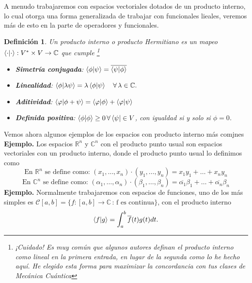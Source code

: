 \documentclass[letterpaper]{book}
\newtheorem{def.}{Definici\'on}[section]
\newcommand{\eje}{{\noindent \sc \textbf{Ejemplo. }}}
\newcommand{\co}{\ensuremath{\mathbb C }}
\newcommand{\re}{\ensuremath{\mathbb R }}
\begin{document}
A menudo trabajaremos con espacios vectoriales dotados de un producto interno, lo cual otorga una forma generalizada de trabajar con funcionales lieales, veremos más de esto en la parte de operadores y funcionales.
\begin{def.}
Un \emph{producto interno o producto Hermitiano} es un mapeo \( \braket{\cdot|\cdot} : V^{*} \times V \to \co\) que cumple \footnote{¡Cuidado! Es muy común que algunos autores definan el producto interno como lineal en la primera entrada, en lugar de la segunda como lo he hecho aquí. He elegido esta forma para maximizar la concordancia con tus clases de Mecánica Cuántica}

\begin{itemize}
    \item \textbf{Simetría conjugada}: \(\braket{\phi | \psi} = \overline{\braket{\psi | \phi}}\)
    \item \textbf{Linealidad}: \(\braket{\phi | \lambda \psi} = \lambda\braket{\phi|\psi}\quad\forall\,\lambda\in\co.\)
    \item \textbf{Aditividad}: \(\braket{\varphi | \phi + \psi} = \braket{\varphi | \phi} + \braket{\varphi|\psi}\)
    \item \textbf{Definida positiva}: \(\braket{\phi | \phi} \geq 0\,\forall \bra{\psi} \in V\), con igualdad si y solo si \(\phi = 0\).
\end{itemize}
\end{def.}
Vemos ahora algunos ejemplos de los espacios con producto interno más comjnes
\eje Los espacios \(\re^n\) y \(\co^n\) con el producto punto usual son espacios vectoriales con un producto interno, donde el producto punto usual lo definimos como
\[
\text{En \(\re^n\) se define como: }(x_1,\dots,x_n)\cdot(y_1,\dots,y_n)=x_1y_1+\dots+x_ny_n
\]
\[
\text{En \(\co^n\) se define como: }(\alpha_1,\dots,\alpha_n)\cdot(\beta_1,\dots,\beta_n)=\overline{\alpha_1}\beta_1+\dots+\overline{\alpha_n}\beta_n
\]
\eje Normalmente trabajaremos con espacios de funciones, uno de los más simples es \(\mathcal{C}[a,b]=\{f:[a,b]\rightarrow\co\,:\,\text{f es continua}\}\), con el producto interno
\[
\braket{f|g}=\int_a^b\overline{f}(t)g(t)dt.
\]
\end{document}
